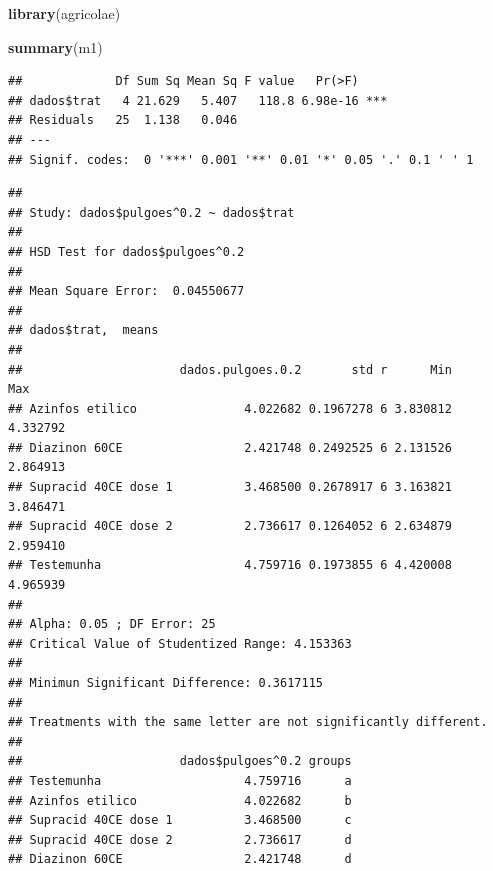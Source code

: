 \documentclass[
]{book}
\newenvironment{Shaded}{\begin{snugshade}}{\end{snugshade}}
\newcommand{\CommentTok}[1]{\textcolor[rgb]{0.56,0.35,0.01}{\textit{#1}}}
\newcommand{\DataTypeTok}[1]{\textcolor[rgb]{0.13,0.29,0.53}{#1}}
\newcommand{\FloatTok}[1]{\textcolor[rgb]{0.00,0.00,0.81}{#1}}
\newcommand{\KeywordTok}[1]{\textcolor[rgb]{0.13,0.29,0.53}{\textbf{#1}}}
\newcommand{\NormalTok}[1]{#1}
\newcommand{\OperatorTok}[1]{\textcolor[rgb]{0.81,0.36,0.00}{\textbf{#1}}}
\newcommand{\StringTok}[1]{\textcolor[rgb]{0.31,0.60,0.02}{#1}}
\begin{document}
\begin{Shaded}
\begin{Highlighting}[]
\KeywordTok{library}\NormalTok{(agricolae)}
\end{Highlighting}
\end{Shaded}

\begin{Shaded}
\begin{Highlighting}[]
\KeywordTok{summary}\NormalTok{(m1)}
\end{Highlighting}
\end{Shaded}

\begin{verbatim}
##             Df Sum Sq Mean Sq F value   Pr(>F)    
## dados$trat   4 21.629   5.407   118.8 6.98e-16 ***
## Residuals   25  1.138   0.046                     
## ---
## Signif. codes:  0 '***' 0.001 '**' 0.01 '*' 0.05 '.' 0.1 ' ' 1
\end{verbatim}

\begin{Shaded}
\end{Shaded}

\begin{verbatim}
## 
## Study: dados$pulgoes^0.2 ~ dados$trat
## 
## HSD Test for dados$pulgoes^0.2 
## 
## Mean Square Error:  0.04550677 
## 
## dados$trat,  means
## 
##                      dados.pulgoes.0.2       std r      Min      Max
## Azinfos etilico               4.022682 0.1967278 6 3.830812 4.332792
## Diazinon 60CE                 2.421748 0.2492525 6 2.131526 2.864913
## Supracid 40CE dose 1          3.468500 0.2678917 6 3.163821 3.846471
## Supracid 40CE dose 2          2.736617 0.1264052 6 2.634879 2.959410
## Testemunha                    4.759716 0.1973855 6 4.420008 4.965939
## 
## Alpha: 0.05 ; DF Error: 25 
## Critical Value of Studentized Range: 4.153363 
## 
## Minimun Significant Difference: 0.3617115 
## 
## Treatments with the same letter are not significantly different.
## 
##                      dados$pulgoes^0.2 groups
## Testemunha                    4.759716      a
## Azinfos etilico               4.022682      b
## Supracid 40CE dose 1          3.468500      c
## Supracid 40CE dose 2          2.736617      d
## Diazinon 60CE                 2.421748      d
\end{verbatim}
\end{document}

